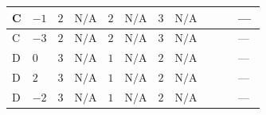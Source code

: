\documentclass[8pt]{article}
\begin{document}
\begin{landscape}
\begin{longtable}{@{}llcccccc >{\raggedright\arraybackslash}p{0.21\linewidth} >{\raggedright\arraybackslash}p{0.21\linewidth} >{\raggedright\arraybackslash}p{0.21\linewidth}@{}}
\midrule
C & $-1$ & $2$ & $\text{N/A}$ & $2$ & $\text{N/A}$ & $3$ & $\text{N/A}$ & \scriptsize\adjustbox{max width=\linewidth}{$\begin{gathered} +4 {\lambda_{HS_2}^{(1)}}^2\end{gathered}$} & \scriptsize\adjustbox{max width=\linewidth}{$\begin{gathered} +12 {\lambda_{S_2}^{(1)}}^2\end{gathered}$} & --- \\
\midrule
C & $-3$ & $2$ & $\text{N/A}$ & $2$ & $\text{N/A}$ & $3$ & $\text{N/A}$ & \scriptsize\adjustbox{max width=\linewidth}{$\begin{gathered} +4 {\lambda_{HS_2}^{(1)}}^2\end{gathered}$} & \scriptsize\adjustbox{max width=\linewidth}{$\begin{gathered} +12 {\lambda_{S_2}^{(1)}}^2\end{gathered}$} & --- \\
\midrule
D & $0$ & $3$ & $\text{N/A}$ & $1$ & $\text{N/A}$ & $2$ & $\text{N/A}$ & \scriptsize\adjustbox{max width=\linewidth}{$\begin{gathered} +4 {\lambda_{HS_2}^{(1)}}^2\end{gathered}$} & \scriptsize\adjustbox{max width=\linewidth}{$\begin{gathered} +10 {\lambda_{S_2}^{(1)}}^2\end{gathered}$} & --- \\
\midrule
D & $2$ & $3$ & $\text{N/A}$ & $1$ & $\text{N/A}$ & $2$ & $\text{N/A}$ & \scriptsize\adjustbox{max width=\linewidth}{$\begin{gathered} +4 {\lambda_{HS_2}^{(1)}}^2\end{gathered}$} & \scriptsize\adjustbox{max width=\linewidth}{$\begin{gathered} +10 {\lambda_{S_2}^{(1)}}^2\end{gathered}$} & --- \\
\midrule
D & $-2$ & $3$ & $\text{N/A}$ & $1$ & $\text{N/A}$ & $2$ & $\text{N/A}$ & \scriptsize\adjustbox{max width=\linewidth}{$\begin{gathered} +4 {\lambda_{HS_2}^{(1)}}^2\end{gathered}$} & \scriptsize\adjustbox{max width=\linewidth}{$\begin{gathered} +10 {\lambda_{S_2}^{(1)}}^2\end{gathered}$} & --- \\
\midrule

\end{longtable}
\end{landscape}
\end{document}

